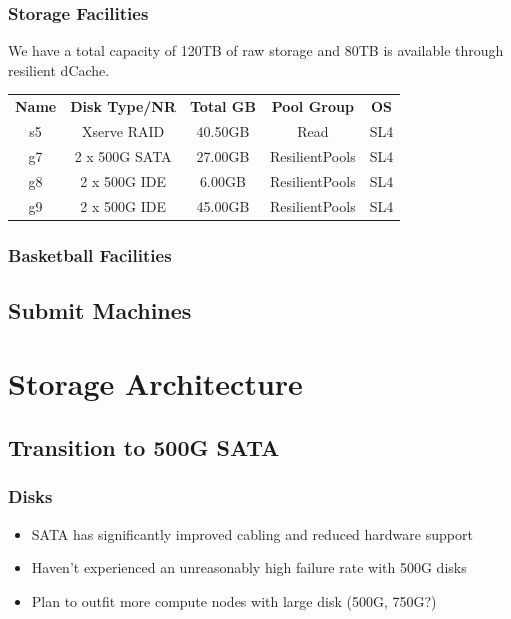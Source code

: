 \documentclass{beamer}
\begin{document}
\begin{frame}
\frametitle{Storage Facilities}
We have a total capacity of 120TB of raw storage and 80TB is available through 
resilient dCache.
\begin{tabular}[c]{|c|c|c|c|c|}
\hline
{\bf Name}   & {\bf Disk Type/NR} & {\bf Total GB}  & {\bf Pool Group}  & {\bf OS} \\
s5  & Xserve RAID   & 40.50GB   & Read              & SL4 \\
g7  & 2 x 500G SATA & 27.00GB   & ResilientPools    & SL4 \\
g8  & 2 x 500G IDE  & 6.00GB    & ResilientPools    & SL4 \\
g9  & 2 x 500G IDE  & 45.00GB   & ResilientPools    & SL4 \\
\hline
\end{tabular}
\end{frame}

\begin{frame}
\frametitle{Basketball Facilities}
\end{frame}

\subsection{Submit Machines}

\section{Storage Architecture}
\subsection{Transition to 500G SATA}
\begin{frame}
\frametitle{Disks}
\begin{itemize}
    \item SATA has significantly improved cabling and reduced hardware support
    \item Haven't experienced an unreasonably high failure rate with 500G disks
    \item Plan to outfit more compute nodes with large disk (500G, 750G?)
\end{itemize}
\end{frame}
\end{document}
